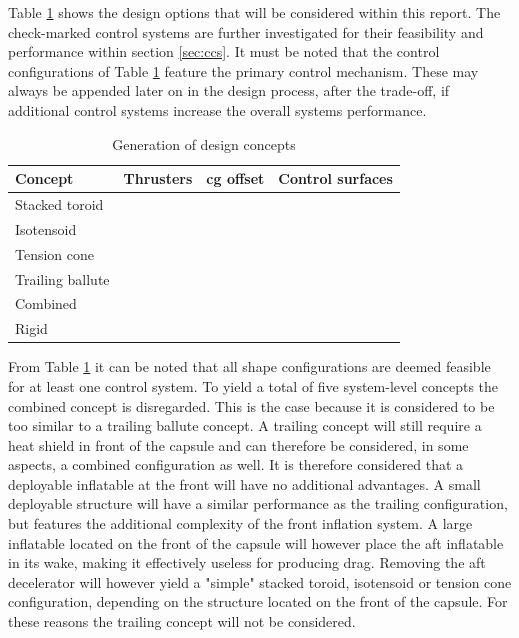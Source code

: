 Table \ref{tab:designconcepts} shows the design options that will be considered within this report. The check-marked control systems are further investigated for their feasibility and performance within section \ref{sec:ccs}. It must be noted that the control configurations of Table \ref{tab:designconcepts} feature the primary control mechanism. These may always be appended later on in the design process, after the trade-off, if additional control systems increase the overall systems performance. 

\begin{table}[H]
	\caption{Generation of design concepts}
	\label{tab:designconcepts}
	\centering
		\begin{tabular}{|p{}|p{}|p{}|p{}|} \hline 
			\textbf{Concept} & \textbf{Thrusters}	& \textbf{\gls{cg} offset} &  \textbf{Control surfaces} \\ \hline \hline
			Stacked toroid   & \cmark	& \cmark &  \cmark \\ \hline
			Isotensoid		 & \cmark	& \cmark &  \cmark\\  \hline
			Tension cone	 & \cmark	& \cmark &  \cmark \\ \hline
			Trailing ballute & \xmark	& \xmark &  \cmark \\ \hline
			Combined 		 & \xmark	& \xmark &  \cmark \\ \hline
			Rigid  		   	 & \cmark	& \cmark &  \cmark \\ \hline
		\end{tabular}
\end{table}

From Table \ref{tab:designconcepts} it can be noted that all shape configurations are deemed feasible for at least one control system. To yield a total of five system-level concepts the combined concept is disregarded. This is the case because it is considered to be too similar to a trailing ballute concept. A trailing concept will still require a heat shield in front of the capsule and can therefore be considered, in some aspects, a combined configuration as well. It is therefore considered that a deployable inflatable at the front will have no additional advantages. A small deployable structure will have a similar performance as the trailing configuration, but features the additional complexity of the front inflation system. A large inflatable located on the front of the capsule will however place the aft inflatable in its wake, making it effectively useless for producing drag. Removing the aft decelerator will however yield a "simple" stacked toroid, isotensoid or tension cone configuration, depending on the structure located on the front of the capsule. For these reasons the trailing concept will not be considered. 
 
